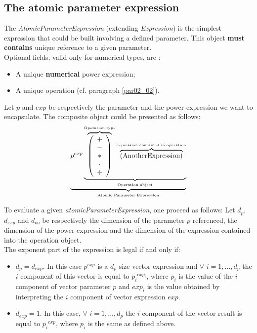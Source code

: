 \documentclass[a4paper,11pt] {article}
\begin{document}
\subsection{The atomic parameter expression}\label{par02_01}
The {\it AtomicParameterExpression} (extending {\it Expression}) is the simplest expression that could be built involving a defined parameter. This object {\bf must contains} unique reference to a given parameter.\\

Optional fields, valid only for numerical types, are : 
\begin{itemize}
\item A unique {\bf numerical} power expression;
\item A unique operation (cf. paragraph \ref{par02_02}).\\
\end{itemize}
Let $p$ and $exp$ be respectively the parameter and the power expression we want to encapsulate. The composite object could be presented as follows:
\begin{equation}\label{eq01}
 \underbrace{  p^{exp} \underbrace{  \overbrace{\left( \begin{array}{c} + \\ - \\ \ast  \\ \cdot \\ \div   \end{array} \right) }^{\mbox{\tiny Operation type}}
 \overbrace{    \left( \mbox{AnotherExpression}\right) }^{\mbox{\tiny expression contained in operation}}   }_{\mbox{\tiny Operation object}}}_{\mbox{\tiny Atomic Parameter Expression}}
\end{equation}

To evaluate a given {\it atomicParameterExpression}, one proceed as follows: 
Let $d_p$, $d_{exp}$ and $d_{oo}$ be respectively the dimension of the parameter $p$ referenced, the dimension of the power expression and the dimension of the expression contained into the operation object.\\
The exponent part of the expression is legal if and only if:
\begin{itemize}
\item $d_p=d_{exp}$. In this case $p^{exp}$ is a $d_p$-size vector expression and $\forall$ $i=1,...,d_p$ the $i$ component of this vector is equal to ${p_i}^{exp_i}$, where $p_i$ is the value of the $i$ component of vector parameter $p$ and $exp_i$ is the value obtained by interpreting the $i$ component of vector expression $exp$.
\item $d_{exp}=1$. In this case, $\forall$ $i=1,...,d_p$ the $i$ component of the vector result is equal to ${p_i}^{exp}$, where $p_i$ is the same as defined above.\\
\end{itemize} 
\end{document}
